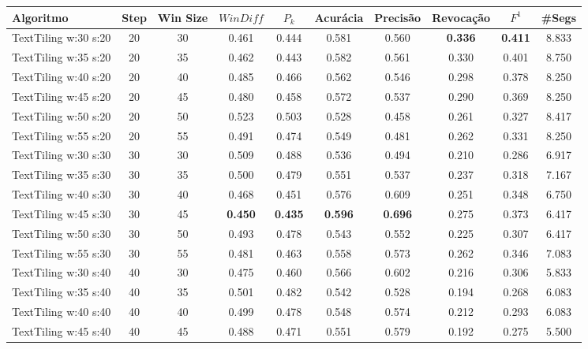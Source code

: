 \documentclass{article}
\begin{document}
 

\begin{longtable}[c]{|l|c|c|c|c|c|c|c|c|c|} 
\hline 
Algoritmo & Step & Win Size & $WinDiff$ & $P_k$ & Acurácia & Precisão & Revocação & $F^1$ & \#Segs\\ \hline 
TextTiling w:30 s:20 & 20 & 30 & 0.461 & 0.444 & 0.581 & 0.560 & \cellcolor{gray!20} \textbf{0.336} & \cellcolor{gray!20} \textbf{0.411} & 8.833  \\ \hline 
 TextTiling w:35 s:20 & 20 & 35 & 0.462 & 0.443 & 0.582 & 0.561 & 0.330 & 0.401 & 8.750  \\ \hline 
 TextTiling w:40 s:20 & 20 & 40 & 0.485 & 0.466 & 0.562 & 0.546 & 0.298 & 0.378 & 8.250  \\ \hline 
 TextTiling w:45 s:20 & 20 & 45 & 0.480 & 0.458 & 0.572 & 0.537 & 0.290 & 0.369 & 8.250  \\ \hline 
 TextTiling w:50 s:20 & 20 & 50 & 0.523 & 0.503 & 0.528 & 0.458 & 0.261 & 0.327 & 8.417  \\ \hline 
 TextTiling w:55 s:20 & 20 & 55 & 0.491 & 0.474 & 0.549 & 0.481 & 0.262 & 0.331 & 8.250  \\ \hline 
 TextTiling w:30 s:30 & 30 & 30 & 0.509 & 0.488 & 0.536 & 0.494 & 0.210 & 0.286 & 6.917  \\ \hline 
 TextTiling w:35 s:30 & 30 & 35 & 0.500 & 0.479 & 0.551 & 0.537 & 0.237 & 0.318 & 7.167  \\ \hline 
 TextTiling w:40 s:30 & 30 & 40 & 0.468 & 0.451 & 0.576 & 0.609 & 0.251 & 0.348 & 6.750  \\ \hline 
 TextTiling w:45 s:30 & 30 & 45 & \cellcolor{gray!20} \textbf{0.450} & \cellcolor{gray!20} \textbf{0.435} & \cellcolor{gray!20} \textbf{0.596} & \cellcolor{gray!20} \textbf{0.696} & 0.275 & 0.373 & 6.417  \\ \hline 
 TextTiling w:50 s:30 & 30 & 50 & 0.493 & 0.478 & 0.543 & 0.552 & 0.225 & 0.307 & 6.417  \\ \hline 
 TextTiling w:55 s:30 & 30 & 55 & 0.481 & 0.463 & 0.558 & 0.573 & 0.262 & 0.346 & 7.083  \\ \hline 
 TextTiling w:30 s:40 & 40 & 30 & 0.475 & 0.460 & 0.566 & 0.602 & 0.216 & 0.306 & 5.833  \\ \hline 
 TextTiling w:35 s:40 & 40 & 35 & 0.501 & 0.482 & 0.542 & 0.528 & 0.194 & 0.268 & 6.083  \\ \hline 
 TextTiling w:40 s:40 & 40 & 40 & 0.499 & 0.478 & 0.548 & 0.574 & 0.212 & 0.293 & 6.083  \\ \hline 
 TextTiling w:45 s:40 & 40 & 45 & 0.488 & 0.471 & 0.551 & 0.579 & 0.192 & 0.275 & 5.500  \\ \hline 

\end{longtable}
\end{document}

